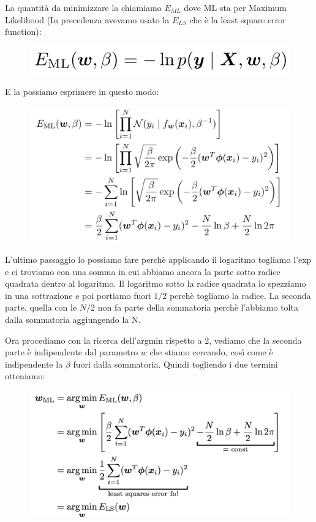 \documentclass[14pt]{extreport}
\begin{document}
La quantità da minimizzare la chiamiamo $E_{ML}$ dove ML sta per Maximum Likelihood (In precedenza avevamo usato la $E_{LS}$ che è la least square
error function):
\begin{figure}[H]
	\centering
	\includegraphics[width=0.4\linewidth]{108.jpeg}
\end{figure}

E la possiamo esprimere in questo modo:

\begin{figure}[H]
	\centering
	\includegraphics[width=0.6\linewidth]{109.jpeg}
\end{figure}

L'ultimo passaggio lo possiamo fare perchè applicando il logaritmo togliamo l'exp e ci troviamo con una somma in cui abbiamo ancora la parte sotto
radice quadrata dentro al logaritmo. Il logaritmo sotto la radice quadrata lo spezziamo in una sottrazione e poi portiamo fuori $1/2$ perchè togliamo
la radice. La seconda parte, quella con le $N/2$ non fa parte della sommatoria perchè l'abbiamo tolta dalla sommatoria aggiungendo la N.

Ora procediamo con la ricerca dell'argmin rispetto a 2, vediamo che la seconda parte è indipendente dal parametro $w$ che stiamo cercando, così come è
indipendente la $\beta$ fuori dalla sommatoria. Quindi togliendo i due termini otteniamo:

\begin{figure}[H]
	\centering
	\includegraphics[width=0.7\linewidth]{111.jpeg}
\end{figure}
\end{document}
